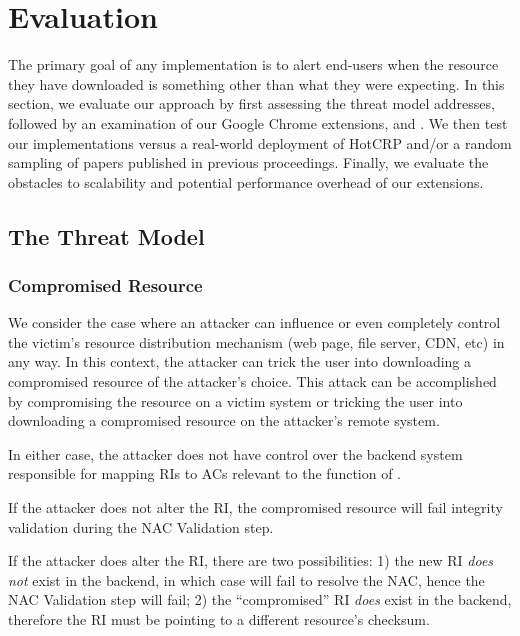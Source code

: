 \section{Evaluation} \label{sec:evaluation}

The primary goal of any \SYSTEM{} implementation is to alert end-users when the
resource they have downloaded is something other than what they were expecting.
In this section, we evaluate our approach by first assessing the threat model
\SYSTEM{} addresses, followed by an examination of our Google
Chrome extensions, \DNSSYS{} and \DHTSYS{}. We then test our implementations
versus a real-world deployment of HotCRP and/or a random sampling of papers
published in previous \CONFERENCE{} proceedings. Finally, we evaluate the
obstacles to scalability and potential performance overhead of our extensions.

\subsection{The Threat Model}

\subsubsection{Compromised Resource}

We consider the case where an attacker can influence or even completely control
the victim's resource distribution mechanism (web page, file server, CDN, etc)
in any way. In this context, the attacker can trick the user into downloading a
compromised resource of the attacker's choice. This attack can be accomplished
by compromising the resource on a victim system or tricking the user into
downloading a compromised resource on the attacker's remote system.

In either case, the attacker does not have control over the backend system
responsible for mapping RIs to ACs relevant to the function of \SYSTEM{}.

If the attacker does not alter the RI, the compromised resource will fail
integrity validation during the NAC Validation step.

If the attacker does alter the RI, there are two possibilities: 1) the new RI
\textit{does not} exist in the backend, in which case \SYSTEM{} will fail to
resolve the NAC, hence the NAC Validation step will fail; 2) the ``compromised''
RI \textit{does} exist in the backend, therefore the RI must be pointing to a
different resource's checksum.

